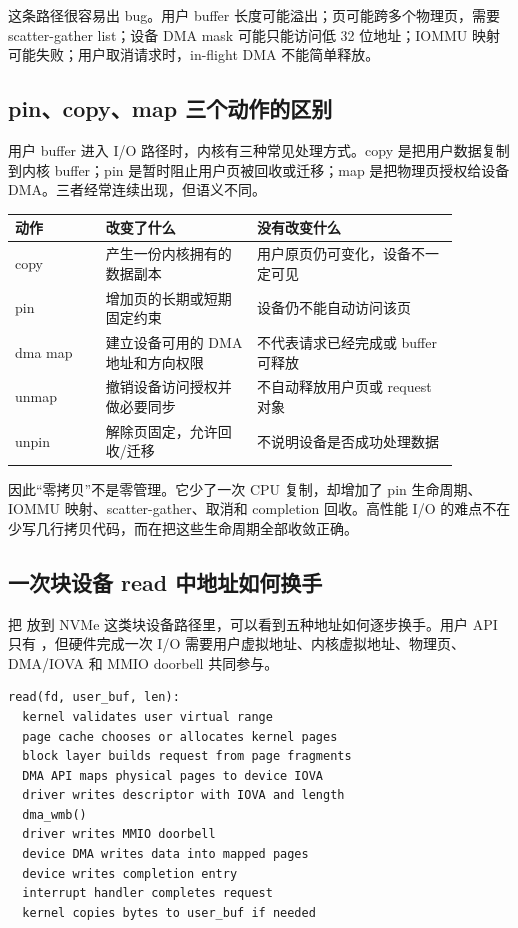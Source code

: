 这条路径很容易出 bug。用户 buffer 长度可能溢出；页可能跨多个物理页，需要 scatter-gather list；设备 DMA mask 可能只能访问低 32 位地址；IOMMU 映射可能失败；用户取消请求时，in-flight DMA 不能简单释放。

\subsection{pin、copy、map 三个动作的区别}

用户 buffer 进入 I/O 路径时，内核有三种常见处理方式。copy 是把用户数据复制到内核 buffer；pin 是暂时阻止用户页被回收或迁移；map 是把物理页授权给设备 DMA。三者经常连续出现，但语义不同。

\begin{longtable}{p{0.18\linewidth}p{0.30\linewidth}p{0.40\linewidth}}
\toprule
动作 & 改变了什么 & 没有改变什么 \\
\midrule
copy & 产生一份内核拥有的数据副本 & 用户原页仍可变化，设备不一定可见 \\
pin & 增加页的长期或短期固定约束 & 设备仍不能自动访问该页 \\
dma map & 建立设备可用的 DMA 地址和方向权限 & 不代表请求已经完成或 buffer 可释放 \\
unmap & 撤销设备访问授权并做必要同步 & 不自动释放用户页或 request 对象 \\
unpin & 解除页固定，允许回收/迁移 & 不说明设备是否成功处理数据 \\
\bottomrule
\end{longtable}

因此“零拷贝”不是零管理。它少了一次 CPU 复制，却增加了 pin 生命周期、IOMMU 映射、scatter-gather、取消和 completion 回收。高性能 I/O 的难点不在少写几行拷贝代码，而在把这些生命周期全部收敛正确。

\subsection{一次块设备 read 中地址如何换手}

把  放到 NVMe 这类块设备路径里，可以看到五种地址如何逐步换手。用户 API 只有 ，但硬件完成一次 I/O 需要用户虚拟地址、内核虚拟地址、物理页、DMA/IOVA 和 MMIO doorbell 共同参与。

\begin{lstlisting}
read(fd, user_buf, len):
  kernel validates user virtual range
  page cache chooses or allocates kernel pages
  block layer builds request from page fragments
  DMA API maps physical pages to device IOVA
  driver writes descriptor with IOVA and length
  dma_wmb()
  driver writes MMIO doorbell
  device DMA writes data into mapped pages
  device writes completion entry
  interrupt handler completes request
  kernel copies bytes to user_buf if needed
\end{lstlisting}

